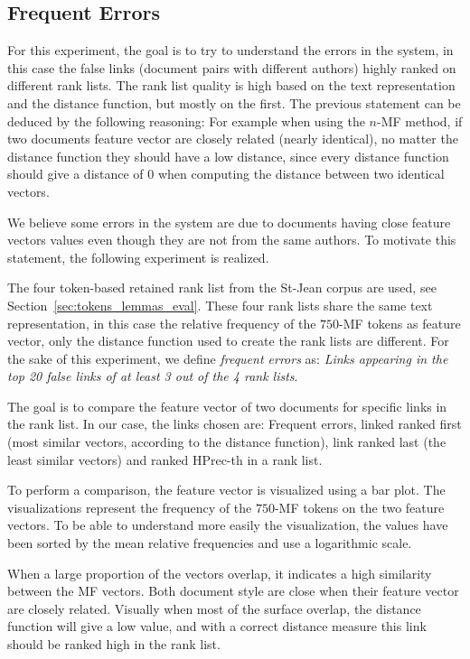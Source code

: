 \subsection{Frequent Errors \label{sec:frequent_errors}}

For this experiment, the goal is to try to understand the errors in the system, in this case the false links (document pairs with different authors) highly ranked on different rank lists.
The rank list quality is high based on the text representation and the distance function, but mostly on the first.
The previous statement can be deduced by the following reasoning: For example when using the $n$-MF method, if two documents feature vector are closely related (nearly identical), no matter the distance function they should have a low distance, since every distance function should give a distance of 0 when computing the distance between two identical vectors.

We believe some errors in the system are due to documents having close feature vectors values even though they are not from the same authors.
To motivate this statement, the following experiment is realized.

The four token-based retained rank list from the St-Jean corpus are used, see Section~\ref{sec:tokens_lemmas_eval}.
These four rank lists share the same text representation, in this case the relative frequency of the $750$-MF tokens as feature vector, only the distance function used to create the rank lists are different.
For the sake of this experiment, we define \textit{frequent errors} as: \textit{Links appearing in the top 20 false links of at least 3 out of the 4 rank lists}.

The goal is to compare the feature vector of two documents for specific links in the rank list.
In our case, the links chosen are: Frequent errors, linked ranked first (most similar vectors, according to the distance function), link ranked last (the least similar vectors) and ranked HPrec-th in a rank list.

To perform a comparison, the feature vector is visualized using a bar plot.
The visualizations represent the frequency of the $750$-MF tokens on the two feature vectors.
To be able to understand more easily the visualization, the values have been sorted by the mean relative frequencies and use a logarithmic scale.

When a large proportion of the vectors overlap, it indicates a high similarity between the MF vectors.
Both document style are close when their feature vector are closely related.
Visually when most of the surface overlap, the distance function will give a low value, and with a correct distance measure this link should be ranked high in the rank list.

